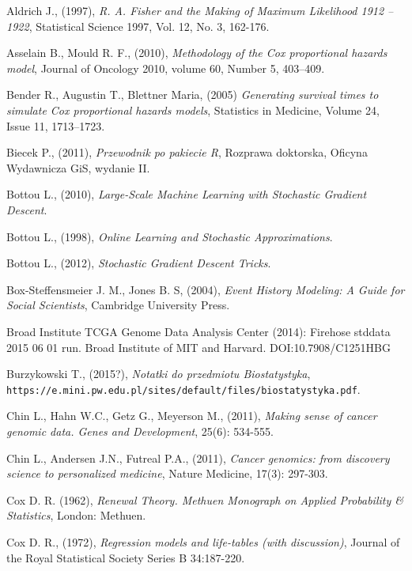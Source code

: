 \begin{thebibliography}{99}

 Aldrich J., (1997), \textit{R. A. Fisher and the Making of Maximum Likelihood 1912 – 1922}, Statistical Science 1997, Vol. 12, No. 3, 162-176.

 Asselain B., Mould R. F., (2010), \textit{Methodology of the Cox proportional hazards model},  Journal of Oncology 2010, volume 60, Number 5,  403–409.

 Bender R., Augustin T., Blettner Maria, (2005) \textit{Generating survival times to simulate Cox proportional hazards models}, Statistics in Medicine, Volume 24, Issue 11, 1713–1723.

 Biecek P., (2011), \textit{Przewodnik po pakiecie R}, Rozprawa doktorska, Oficyna Wydawnicza GiS, wydanie II.

 Bottou L., (2010), \textit{Large-Scale Machine Learning with Stochastic Gradient Descent}.

 Bottou L., (1998), \textit{Online Learning and Stochastic Approximations}.

 Bottou L., (2012), \textit{Stochastic Gradient Descent Tricks}.

 Box-Steffensmeier J. M., Jones B. S, (2004), \textit{Event History Modeling: A Guide for Social Scientists}, Cambridge University Press.


 Broad Institute TCGA Genome Data Analysis Center (2014): Firehose stddata 2015 06 01 run. Broad Institute of MIT and Harvard. DOI:10.7908/C1251HBG

 Burzykowski T., (2015?), \textit{Notatki do przedmiotu Biostatystyka}, \\ \texttt{https://e.mini.pw.edu.pl/sites/default/files/biostatystyka.pdf}.

 Chin L., Hahn W.C., Getz G., Meyerson M., (2011), \textit{Making sense of cancer genomic data. Genes and Development}, 25(6): 534-555.

 Chin L., Andersen J.N., Futreal P.A., (2011), \textit{Cancer genomics: from discovery science to personalized medicine}, Nature Medicine, 17(3): 297-303.

 Cox D. R. (1962), \textit{Renewal Theory. Methuen Monograph on Applied Probability
\& Statistics}, London: Methuen.

  Cox D. R., (1972), \textit{Regression models and life-tables (with discussion)}, Journal of the Royal Statistical Society Series B 34:187-220.



\end{thebibliography}
